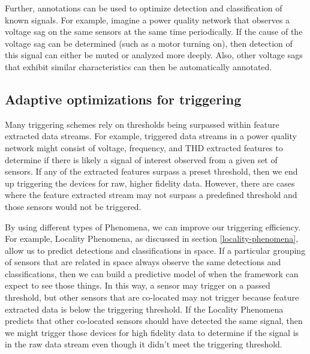 Further, annotations can be used to optimize detection and classification of known signals. For example, imagine a power quality network that observes a voltage sag on the same sensors at the same time periodically. If the cause of the voltage sag can be determined (such as a motor turning on), then detection of this signal can either be muted or analyzed more deeply. Also, other voltage sags that exhibit similar characteristics can then be automatically annotated.

\subsection{Adaptive optimizations for triggering}
Many triggering schemes rely on thresholds being surpassed within feature extracted data streams. For example, triggered data streams in a power quality network might consist of voltage, frequency, and THD extracted features to determine if there is likely a signal of interest observed from a given set of sensors. If any of the extracted features surpass a preset threshold, then we  end up triggering the devices for raw, higher fidelity data. However, there are cases where the feature extracted stream may not surpass a predefined threshold and those sensors would not be triggered.

By using different types of Phenomena, we can improve our triggering efficiency. For example, Locality Phenomena, as discussed in section \ref{locality-phenomena}, allow us to predict detections and classifications in space. If a particular grouping of sensors that are related in space always observe the same detections and classifications, then we can build a predictive model of when the framework can expect to see those things. In this way, a sensor may trigger on a passed threshold, but other sensors that are co-located may not trigger because feature extracted data is below the triggering threshold. If the Locality Phenomena predicts that other co-located sensors should have detected the same signal, then we might trigger those devices for high fidelity data to determine if the signal is in the raw data stream even though it didn't meet the triggering threshold.

